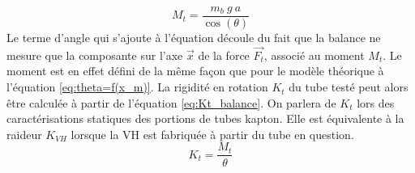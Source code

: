 \begin{equation}
	M_t = \dfrac{m_b\ g\ a}{\cos(\theta)}
	\label{eq:Mt_balance}
\end{equation}
Le terme d'angle qui s'ajoute à l'équation découle du fait que la balance ne mesure que la composante sur l'axe  $\vec{x}$ de la force $\vec{F_t}$, associé au moment $M_t$. Le moment est en effet défini de la même façon que pour le modèle théorique à l'équation \ref{eq:theta=f(x_m)}. La rigidité en rotation $K_t$ du tube testé peut alors être calculée à partir de l'équation \ref{eq:Kt_balance}. On parlera de $K_t$ lors des caractérisations statiques des portions de tubes kapton. Elle est équivalente à la raideur $K_{VH}$ lorsque la VH est fabriquée à partir du tube en question.
 \begin{equation}
	K_t = \dfrac{M_t}{\theta}
	\label{eq:Kt_balance}
\end{equation}
